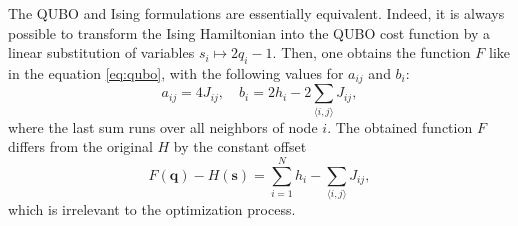     The QUBO and Ising formulations are essentially equivalent. Indeed, it is
    always possible to transform the Ising Hamiltonian into the QUBO cost function
    by a linear substitution of variables $s_i \mapsto 2q_i-1$. Then, one obtains
    the function $F$ like in the equation \eqref{eq:qubo}, with the following
values for $a_{ij}$ and $b_{i}$:
    \begin{equation}
      \label{eq:toQUBO}
      a_{ij}= 4J_{ij},
      \quad
      b_i= 2h_i - 2 \sum_{\langle i, j \rangle} J_{ij},
    \end{equation}
    where the last sum runs over all neighbors of node $i$. The obtained function
  $F$ differs from the original $H$ by the constant offset
\begin{equation}
  F(\mathbf{q}) - H(\mathbf{s}) =\sum_{i=1}^N h_i - \sum_{\langle i, j \rangle} J_{ij},
\end{equation}
which is irrelevant to the optimization process.

